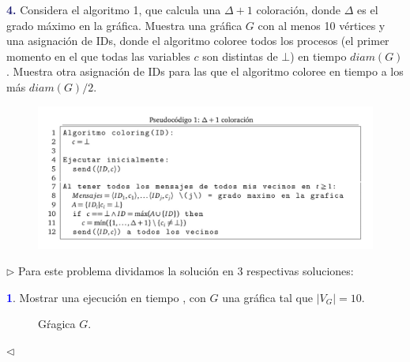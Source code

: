 \newpage
\textbf{\textcolor{MidnightBlue}{4.}} Considera el algoritmo 1,
que calcula una $\Delta + 1$ coloración, donde $\Delta$ es el
grado máximo en la gráfica. Muestra una gráfica $G$ con al menos
10 vértices y una asignación de IDs, donde el algoritmo coloree
todos los procesos (el primer momento en el que todas las variables
$c$ son distintas de $\bot$) en tiempo $diam(G)$. Muestra otra
asignación de IDs para las que el algoritmo coloree en tiempo a los
más $diam(G)/2$.

\begin{figure}[ht]
        \begin{center}
                \includegraphics[width=15cm]{AlgoritmoP5.png}
        \end{center}
\end{figure}

$\rhd$ Para este problema dividamos la solución en $3$ respectivas
soluciones:                                                             \newline

\hspace*{0.5cm} \textbf{\textcolor{blue}{1}}. Mostrar una ejecución
en tiempo , con $G$ una gráfica tal que $|V_G| = 10$.

\begin{figure}[ht!]
     \centering
\caption{Gŕagica $G$.}
\label{fig:fam1}
\end{figure}

\hfill $\lhd$
